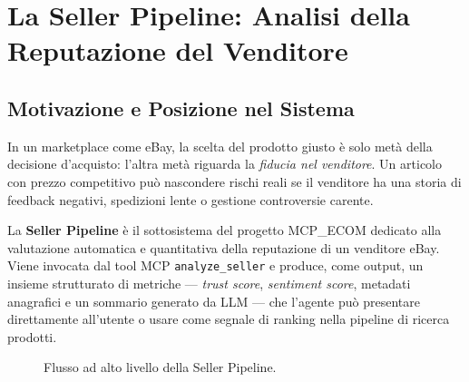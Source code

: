 
\chapter{La Seller Pipeline: Analisi della Reputazione del Venditore}
\label{chap:seller-pipeline}

\section{Motivazione e Posizione nel Sistema}
\label{sec:seller-intro}

In un marketplace come eBay, la scelta del prodotto giusto è solo metà
della decisione d'acquisto: l'altra metà riguarda la \emph{fiducia nel
venditore}. Un articolo con prezzo competitivo può nascondere rischi
reali se il venditore ha una storia di feedback negativi, spedizioni
lente o gestione controversie carente.

La \textbf{Seller Pipeline} è il sottosistema del progetto MCP\_ECOM
dedicato alla valutazione automatica e quantitativa della reputazione
di un venditore eBay. Viene invocata dal tool MCP
\texttt{analyze\_seller} e produce, come output, un insieme strutturato
di metriche — \emph{trust score}, \emph{sentiment score}, metadati
anagrafici e un sommario generato da LLM — che l'agente può
presentare direttamente all'utente o usare come segnale di ranking nella
pipeline di ricerca prodotti.

\begin{figure}[htbp]
    \centering
    \caption{Flusso ad alto livello della Seller Pipeline.}
    \label{fig:seller-pipeline-flow}
\end{figure}


